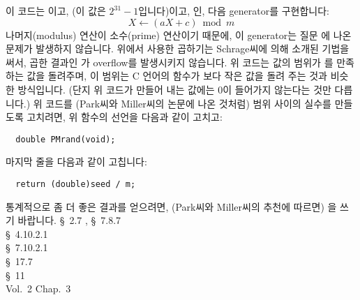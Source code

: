 \begin{faq}
        이 코드는 이고, (이 값은
        $2^{31} - 1$입니다)이고, 인, 다음 generator를 구현합니다:
	\[ X \leftarrow (aX + c) \bmod m \]
	\noindent 나머지(modulus) 연산이 소수(prime) 연산이기 때문에,
        이 generator는 질문 에 나온 문제가 발생하지 않습니다.
        위에서 사용한 곱하기는 Sch\-rage씨에 의해 소개된 기법을 써서, 
        곱한 결과인
        가 overflow를 발생시키지 않습니다. 위 코드는 값의 범위가
        \TT{[1, 2147483647]}를 만족하는  값을 돌려주며,
        이 범위는 C 언어의  함수가 보다 작은 값을
        돌려 주는 것과 비슷한 방식입니다. (단지 위 코드가 만들어 내는 값에는
        0이 들어가지 않는다는 것만 다릅니다.) 위 코드를 (Park씨와 Miller씨의
        논문에 나온 것처럼) 범위  사이의 실수를 만들도록 고치려면,
        위 함수의 선언을 다음과 같이 고치고:
\begin{verbatim}
  double PMrand(void);
\end{verbatim}
	\noindent 마지막 줄을 다음과 같이 고칩니다:
\begin{verbatim}
  return (double)seed / m;
\end{verbatim}
	\noindent 통계적으로 좀 더 좋은 결과를 얻으려면, (Park씨와 Miller씨의
        추천에 따르면) 을 쓰기 바랍니다.
\R
	\cite{kr2} \S\ 2.7 , \S\ 7.8.7  \\
        \cite{ansi} \S\ 4.10.2.1 \\
	\cite{c89} \S\ 7.10.2.1 \\
	\cite{hs} \S\ 17.7  \\
	\cite{pcs} \S\ 11  \\
	\cite{knuth} Vol.\ 2 Chap.\ 3  \\
	\cite{random}
\end{faq}

